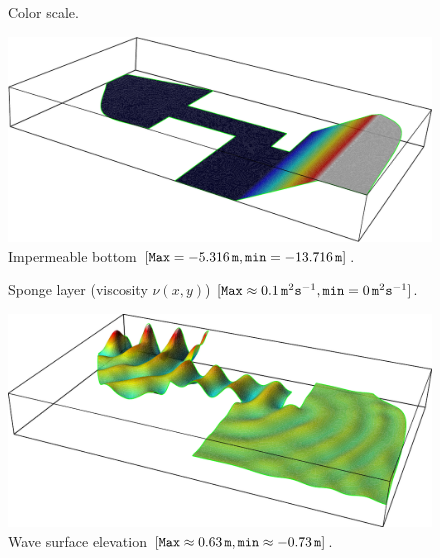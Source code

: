 \begin{figure}
\bwfig
  \centering
  \caption{Color scale.}
  \label{fig:lopes:scale}
\end{figure}

\begin{figure}
\bwfig
  \centering
  \includegraphics[width=\largefig]{chapters/lopes/pdf/depth.pdf}
  \caption{Impermeable bottom $[{\tt Max}=-5.316\,{\tt m},{\tt
      min}=-13.716\,{\tt m}]$.}
  \label{fig:lopes:harbor_depth}
\end{figure}

\begin{figure}
\bwfig
  \centering
  \caption{Sponge layer (viscosity $\nu(x,y)$) $[{\tt Max} \approx
    0.1\,{\tt m}^2{\tt s}^{-1}, {\tt min}=0 \,{\tt m}^2{\tt s}^{-1}]$.}
  \label{fig:lopes:sponge}
\end{figure}

\begin{figure}
\bwfig
  \centering
  \includegraphics[width=\largefig]{chapters/lopes/pdf/eta.pdf}
  \caption{Wave surface elevation $[{\tt Max}\approx 0.63\,{\tt m},
    {\tt min}\approx-0.73\,{\tt m}] $.}
  \label{fig:lopes:elevation}
\end{figure}

